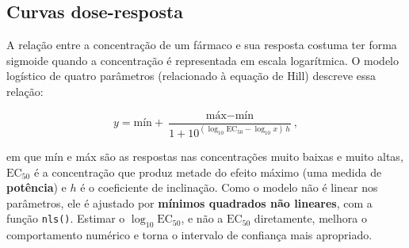 \documentclass[
]{book}
\newenvironment{Shaded}{\begin{snugshade}}{\end{snugshade}}
\newcommand{\AttributeTok}[1]{\textcolor[rgb]{0.13,0.29,0.53}{#1}}
\newcommand{\DecValTok}[1]{\textcolor[rgb]{0.00,0.00,0.81}{#1}}
\newcommand{\FloatTok}[1]{\textcolor[rgb]{0.00,0.00,0.81}{#1}}
\newcommand{\FunctionTok}[1]{\textcolor[rgb]{0.13,0.29,0.53}{\textbf{#1}}}
\newcommand{\NormalTok}[1]{#1}
\newcommand{\OtherTok}[1]{\textcolor[rgb]{0.56,0.35,0.01}{#1}}
\newcommand{\SpecialCharTok}[1]{\textcolor[rgb]{0.81,0.36,0.00}{\textbf{#1}}}
\begin{document}
\subsection{Curvas dose-resposta}\label{curvas-dose-resposta}

A relação entre a concentração de um fármaco e sua resposta costuma ter forma sigmoide quando a concentração é representada em escala logarítmica. O modelo logístico de quatro parâmetros (relacionado à equação de Hill) descreve essa relação:

\[
y = \text{mín} + \frac{\text{máx} - \text{mín}}{1 + 10^{(\log_{10}\text{EC}_{50} - \log_{10} x)\,h}},
\]

em que mín e máx são as respostas nas concentrações muito baixas e muito altas, \(\text{EC}_{50}\) é a concentração que produz metade do efeito máximo (uma medida de \textbf{potência}) e \(h\) é o coeficiente de inclinação. Como o modelo não é linear nos parâmetros, ele é ajustado por \textbf{mínimos quadrados não lineares}, com a função \texttt{nls()}. Estimar o \(\log_{10}\text{EC}_{50}\), e não a \(\text{EC}_{50}\) diretamente, melhora o comportamento numérico e torna o intervalo de confiança mais apropriado.

\begin{Shaded}
\end{Shaded}
\end{document}
